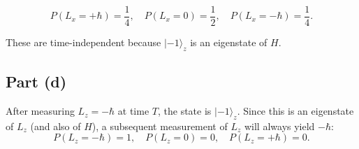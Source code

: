 \documentclass[12pt]{article}
\begin{document}
\[
\boxed{P(L_x = +\hbar) = \frac{1}{4}, \quad P(L_x = 0) = \frac{1}{2}, \quad P(L_x = -\hbar) = \frac{1}{4}.}
\]

These are time-independent because $|-1\rangle_z$ is an eigenstate of $H$.

\subsection*{Part (d)}

After measuring $L_z = -\hbar$ at time $T$, the state is $|-1\rangle_z$. Since this is an eigenstate of $L_z$ (and also of $H$), a subsequent measurement of $L_z$ will always yield $-\hbar$:
\[
\boxed{P(L_z = -\hbar) = 1, \quad P(L_z = 0) = 0, \quad P(L_z = +\hbar) = 0.}
\]
\end{document}

